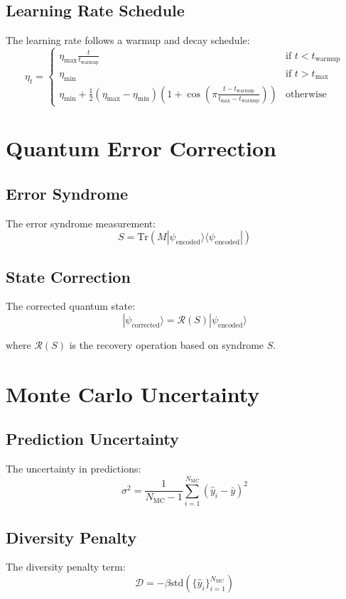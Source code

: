 \documentclass{article}
\begin{document}
\subsection{Learning Rate Schedule}
The learning rate follows a warmup and decay schedule:
\begin{equation}
\eta_t = \begin{cases}
\eta_{\text{max}}\frac{t}{t_{\text{warmup}}} & \text{if } t < t_{\text{warmup}} \\
\eta_{\text{min}} & \text{if } t > t_{\text{max}} \\
\eta_{\text{min}} + \frac{1}{2}(\eta_{\text{max}}-\eta_{\text{min}})(1 + \cos(\pi\frac{t-t_{\text{warmup}}}{t_{\text{max}}-t_{\text{warmup}}})) & \text{otherwise}
\end{cases}
\end{equation}

\section{Quantum Error Correction}

\subsection{Error Syndrome}
The error syndrome measurement:
\begin{equation}
S = \text{Tr}(M|\psi_{\text{encoded}}\rangle\langle\psi_{\text{encoded}}|)
\end{equation}

\subsection{State Correction}
The corrected quantum state:
\begin{equation}
|\psi_{\text{corrected}}\rangle = \mathcal{R}(S)|\psi_{\text{encoded}}\rangle
\end{equation}

where $\mathcal{R}(S)$ is the recovery operation based on syndrome $S$.

\section{Monte Carlo Uncertainty}

\subsection{Prediction Uncertainty}
The uncertainty in predictions:
\begin{equation}
\sigma^2 = \frac{1}{N_{\text{MC}}-1}\sum_{i=1}^{N_{\text{MC}}}(\hat{y}_i - \bar{y})^2
\end{equation}

\subsection{Diversity Penalty}
The diversity penalty term:
\begin{equation}
\mathcal{D} = -\beta\text{std}(\{\hat{y}_i\}_{i=1}^{N_{\text{MC}}})
\end{equation}
\end{document}

